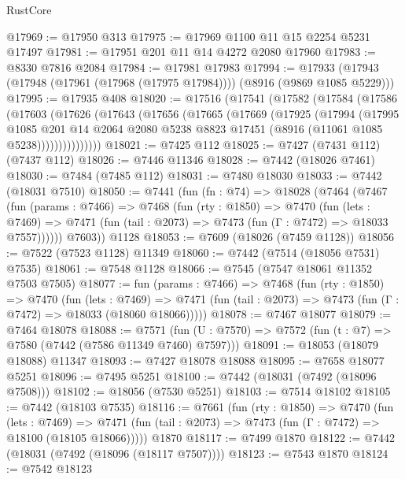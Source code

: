 \begin{lexlean}{RustCore}
\begin{coremodule}
@17969 := @17950 @313
@17975 := @17969 @1100 @11 @15 @2254 @5231 @17497
@17981 := @17951 @201 @11 @14 @4272 @2080 @17960
@17983 := @8330 @7816 @2084
@17984 := @17981 @17983
@17994 := @17933 (@17943 (@17948 (@17961 (@17968 (@17975 @17984)))) (@8916 (@9869 @1085 @5229)))
@17995 := @17935 @408
@18020 := @17516
    (@17541
      (@17582
        (@17584
          (@17586
            (@17603
              (@17626
                (@17643
                  (@17656
                    (@17665
                      (@17669
                        (@17925
                          (@17994
                            (@17995
                              @1085
                              @201
                              @14
                              @2064
                              @2080
                              @5238
                              @8823
                              @17451
                              (@8916 (@11061 @1085 @5238)))))))))))))))
@18021 := @7425 @112
@18025 := @7427 (@7431 @112) (@7437 @112)
@18026 := @7446 @11346
@18028 := @7442 (@18026 @7461)
@18030 := @7484 (@7485 @112)
@18031 := @7480 @18030
@18033 := @7442 (@18031 @7510)
@18050 := @7441
    (fun (fn : @74) =>
    @18028
      (@7464
        (@7467
          (fun (params : @7466) =>
          @7468
            (fun (rty : @1850) =>
            @7470
              (fun (lets : @7469) =>
              @7471 (fun (tail : @2073) => @7473 (fun (Γ : @7472) => @18033 @7557))))))
        @7603))
    @1128
@18053 := @7609 (@18026 (@7459 @1128))
@18056 := @7522 (@7523 @1128) @11349
@18060 := @7442 (@7514 (@18056 @7531) @7535)
@18061 := @7548 @1128
@18066 := @7545 (@7547 @18061 @11352 @7503 @7505)
@18077 := fun (params : @7466) =>
  @7468
    (fun (rty : @1850) =>
    @7470
      (fun (lets : @7469) =>
      @7471 (fun (tail : @2073) => @7473 (fun (Γ : @7472) => @18033 (@18060 @18066)))))
@18078 := @7467 @18077
@18079 := @7464 @18078
@18088 := @7571
    (fun (U : @7570) => @7572 (fun (t : @7) => @7580 (@7442 (@7586 @11349 @7460) @7597)))
@18091 := @18053 (@18079 @18088) @11347
@18093 := @7427 @18078 @18088
@18095 := @7658 @18077 @5251
@18096 := @7495 @5251
@18100 := @7442 (@18031 (@7492 (@18096 @7508)))
@18102 := @18056 (@7530 @5251)
@18103 := @7514 @18102
@18105 := @7442 (@18103 @7535)
@18116 := @7661
    (fun (rty : @1850) =>
    @7470
      (fun (lets : @7469) =>
      @7471 (fun (tail : @2073) => @7473 (fun (Γ : @7472) => @18100 (@18105 @18066)))))
    @1870
@18117 := @7499 @1870
@18122 := @7442 (@18031 (@7492 (@18096 (@18117 @7507))))
@18123 := @7543 @1870
@18124 := @7542 @18123

\end{coremodule}
\end{lexlean}
